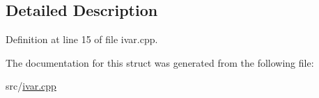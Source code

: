 \subsection{Detailed Description}


Definition at line 15 of file ivar.\+cpp.



The documentation for this struct was generated from the following file\+:\begin{DoxyCompactItemize}
\item 
src/\mbox{\hyperlink{ivar_8cpp}{ivar.\+cpp}}\end{DoxyCompactItemize}
